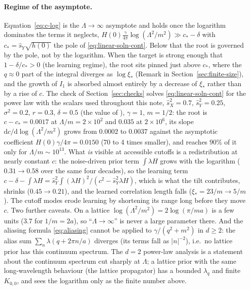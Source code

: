 \documentclass[11pt,a4paper]{article}
\newcommand{\dd}{\mathrm d}
\newcommand{\Lam}{\Lambda}
\newcommand{\sX}{\hat s_X}
\newcommand{\sY}{\hat s_Y}
\begin{document}
\paragraph{Regime of the asymptote.}
Equation~\eqref{eq:c-log} is the $\Lam\to\infty$ asymptote and holds once the logarithm dominates the terms it neglects, $H(0)\frac{\gamma}{4\pi}\log(\Lam^2/m^2)\gg c_*-\delta$ with $c_* = \sY\sqrt{h(0)}$ the pole of \eqref{eq:linear-soln-cont}. Below that the root is governed by the pole, not by the logarithm. When the target is strong enough that $1-\delta/c_*>0$ (the learning regime), the root sits pinned just above $c_*$, where the $q\approx0$ part of the integral diverges as $\log\xi_*$ (Remark in Section~\ref{sec:finite-size}), and the growth of $I_1$ is absorbed almost entirely by a decrease of $\xi_*$ rather than by a rise of $c$. The check of Section~\ref{sec:checks} solves \eqref{eq:linear-soln-cont} for the power law with the scalars used throughout this note, $\sX^2 = 0.7$, $\sY^2 = 0.25$, $\sigma^2 = 0.2$, $r = 0.3$, $\delta = 0.5$ (the value of ), $\gamma = 1$, $m = 1/2$: the root is $c-c_* = 0.0017$ at $\Lam/m = 2\times10^2$ and $0.035$ at $2\times10^6$, its slope $\dd c/\dd\log(\Lam^2/m^2)$ grows from $0.0002$ to $0.0037$ against the asymptotic coefficient $H(0)\gamma/4\pi = 0.0150$ (70 to 4 times smaller), and reaches $90\%$ of it only for $\Lam/m\sim10^{13}$. What \emph{is} visible at accessible cutoffs is a redistribution at nearly constant $c$: the noise-driven prior term $\int\lambda H$ grows with the logarithm ($0.31\to0.58$ over the same four decades), so the learning term $c-\delta-\int\lambda H = \sY^2\int(\lambda H)^2/(c^2-\sY^2\lambda H)$, which is what the tilt contributes, shrinks ($0.45\to0.21$), and the learned correlation length falls ($\xi_* = 23/m\to5/m$). The cutoff modes erode learning by shortening its range long before they move $c$. Two further caveats. On a lattice $\log(\Lam^2/m^2) = 2\log(\pi/ma)$ is a few units ($3.7$ for $1/m = 2a$), so ``$\Lam\to\infty$'' is never a large parameter there. And the aliasing formula \eqref{eq:aliasing} cannot be applied to $\gamma/(q^2+m^2)$ in $d\ge2$: the alias sum $\sum_n\lambda(q+2\pi n/a)$ diverges (its terms fall as $|n|^{-2}$), i.e.\ no lattice prior has this continuum spectrum. The $d=2$ power-law analysis is a statement about the continuum spectrum cut sharply at $\Lam$; a lattice prior with the same long-wavelength behaviour (the lattice propagator) has a bounded $\lambda_q$ and finite $K_{0,0}$, and sees the logarithm only as the finite number above.
\end{document}
